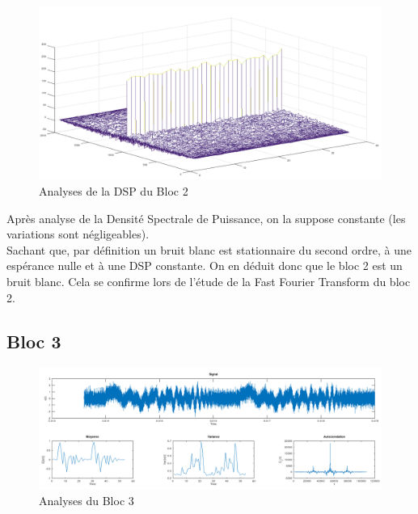 \documentclass[french, a4paper, 12pt, openany]{book}
\begin{document}
	\begin{figure}[ht]
		\begin{center}
		\includegraphics[scale=0.25]{images/AutoCorrBloc2.png}
		\end{center}
		\caption{Analyses de la DSP du Bloc 2}
		\label{Analyses de la DSP du Bloc 2}
	\end{figure}

	Après analyse de la Densité Spectrale de Puissance, on la suppose constante (les variations sont négligeables). \\
	Sachant que, par définition un bruit blanc est stationnaire du second ordre, à une espérance nulle et à une DSP constante. On en déduit donc que le bloc 2 est un bruit blanc. Cela se confirme lors de l'étude de la Fast Fourier Transform du bloc 2.

  \subsection{Bloc 3}

	\begin{figure}[ht]
		\begin{center}
		\includegraphics[scale=0.25]{images/SignalBloc3.png}
		\end{center}
		\caption{Analyses du Bloc 3}
		\label{Analyses du Bloc 3}
	\end{figure}
\end{document}

